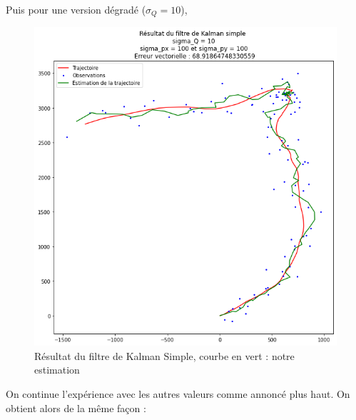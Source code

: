 Puis pour une version dégradé ($\sigma_{Q} = 10 $),


\begin{figure}[hbt!]
	\centering
	\includegraphics[scale=0.4]{./images/res3.png}
	\caption{\centering Résultat du filtre de Kalman Simple, courbe en vert : notre estimation}
\end{figure}
\FloatBarrier
On continue l'expérience avec les autres valeurs comme annoncé plus haut.
\newpage
On obtient alors de la même façon :
